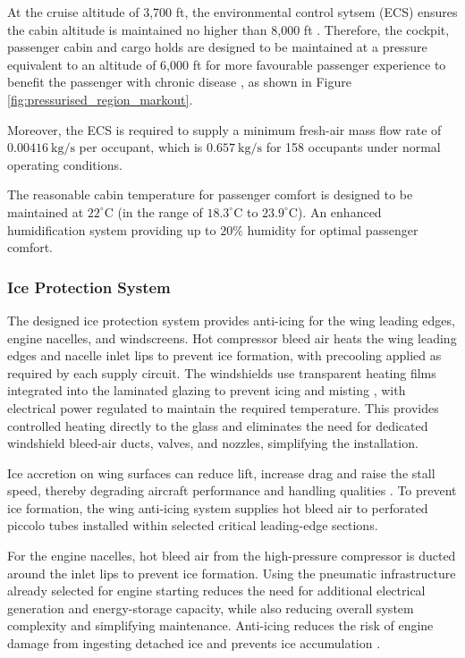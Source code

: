 At the cruise altitude of 3,700 ft, the environmental control sytsem (ECS) ensures the cabin altitude is maintained no higher than 8,000 ft \cite{FAR}. Therefore, the cockpit, passenger cabin and cargo holds are designed to be maintained at a pressure equivalent to an altitude of 6,000 ft for more favourable passenger experience to benefit the passenger with chronic disease \cite{CDCYellowBook}, as shown in Figure \ref{fig:pressurised_region_markout}.

Moreover, the ECS is required to supply a minimum fresh-air mass flow rate of $0.00416~\mathrm{kg/s}$ per occupant, which is $0.657~\mathrm{kg/s}$ for 158 occupants under normal operating conditions\cite{FAR}. 

The reasonable cabin temperature for passenger comfort is designed to be maintained at $22^\circ\text{C}$ (in the range of $18.3^\circ\text{C}$ to $23.9^\circ\text{C}$)\cite{FAR,22degtemp}. An enhanced humidification system providing up to $20\%$ humidity \cite{20humidity} for optimal passenger comfort.
\subsubsection{Ice Protection System}
The designed ice protection system provides anti-icing for the wing leading edges, engine nacelles, and windscreens. Hot compressor bleed air heats the wing leading edges and nacelle inlet lips to prevent ice formation, with precooling applied as required by each supply circuit. The windshields use transparent heating films integrated into the laminated glazing to prevent icing and misting \cite{SaintGobain_Heated_Glazing}, with electrical power regulated to maintain the required temperature\cite{FAA_Windshield_Heating}. This provides controlled heating directly to the glass and eliminates the need for dedicated windshield bleed-air ducts, valves, and nozzles, simplifying the installation.

Ice accretion on wing surfaces can reduce lift, increase drag and raise the stall speed, thereby degrading aircraft performance and handling qualities \cite{FAAiceprotection}. To prevent ice formation, the wing anti-icing system supplies hot bleed air to perforated piccolo tubes installed within selected critical leading-edge sections.

For the engine nacelles, hot bleed air from the high-pressure compressor is ducted around the inlet lips to prevent ice formation. Using the pneumatic infrastructure already selected for engine starting reduces the need for additional electrical generation and energy-storage capacity, while also reducing overall system complexity and simplifying maintenance. Anti-icing reduces the risk of engine damage from ingesting detached ice \cite{FAAiceprotection} and prevents ice accumulation \cite{FAR}.

